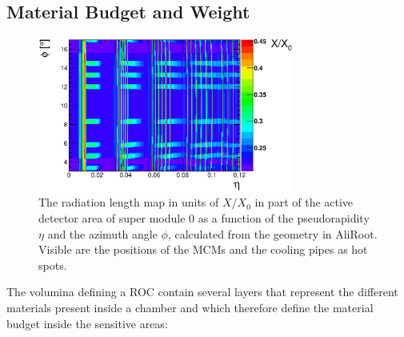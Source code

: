 \documentclass{alicetdr}
\begin{document}
\subsection{Material Budget and Weight}
%
\begin{figure}[htb]
\begin{center}
\includegraphics[width=0.75\textwidth]{plots/geo_material_budget.eps}
\end{center}
\caption{
The radiation length map in units of $X/X_{0}$ in part of the active 
detector area of super module 0 as a function of the pseudorapidity 
$\eta$ and the azimuth angle $\phi$, calculated from the geometry in 
AliRoot.  Visible are the positions of the MCMs and the cooling pipes 
as hot spots.
}
\label{FIG_GEO:mat_budget}
\end{figure}
%
The volumina defining a ROC contain several layers that represent the 
different materials present inside a chamber and which therefore define 
the material budget inside the sensitive areas:
\end{document}
